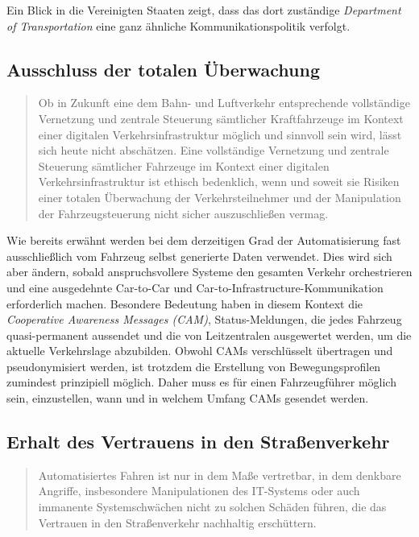 \documentclass[twoside,a4paper,12pt]{article}
\begin{document}
Ein Blick in die Vereinigten Staaten zeigt, dass das dort zuständige \textit{Department of Transportation} eine ganz ähnliche Kommunikationspolitik
verfolgt.~\cite{dot}\\

\subsection{Ausschluss der totalen Überwachung} \label{AusschlussDerTotalenUeberwachung}

\begin{quote}
\glqq
Ob in Zukunft eine dem Bahn- und Luftverkehr entsprechende vollständige Vernetzung
und zentrale Steuerung sämtlicher Kraftfahrzeuge im Kontext einer digitalen Verkehrsinfrastruktur möglich und sinnvoll sein wird, 
lässt sich heute nicht abschätzen. Eine vollständige Vernetzung und zentrale Steuerung sämtlicher Fahrzeuge im Kontext einer 
digitalen Verkehrsinfrastruktur ist ethisch bedenklich, wenn und soweit sie Risiken einer totalen Überwachung der Verkehrsteilnehmer 
und der Manipulation der Fahrzeugsteuerung nicht sicher auszuschließen vermag.\grqq\mbox{~\cite[S. 12]{ek}}
\end{quote}

Wie bereits erwähnt werden bei dem derzeitigen Grad der Automatisierung fast ausschließlich vom Fahrzeug selbst generierte Daten verwendet.
Dies wird sich aber ändern, sobald anspruchsvollere Systeme den gesamten Verkehr orchestrieren und eine ausgedehnte Car-to-Car und 
Car-to-Infrastructure-Kommunikation erforderlich machen. Besondere Bedeutung haben in diesem Kontext die \textit{Cooperative Awareness Messages (CAM)},
Status-Meldungen, die jedes Fahrzeug quasi-permanent aussendet und die von Leitzentralen ausgewertet werden, um die aktuelle Verkehrslage abzubilden.
Obwohl CAMs verschlüsselt übertragen und pseudonymisiert werden, ist trotzdem die Erstellung von Bewegungsprofilen zumindest prinzipiell möglich.
Daher muss es für einen Fahrzeugführer möglich sein, einzustellen, wann und in welchem Umfang CAMs gesendet werden.\\

\subsection{Erhalt des Vertrauens in den Straßenverkehr} \label{ErhaltDesVertrauensInDenStrassenverkehr}

\begin{quote}
\glqq
Automatisiertes Fahren ist nur in dem Maße vertretbar, in dem denkbare Angriffe, insbesondere Manipulationen des 
IT-Systems oder auch immanente Systemschwächen nicht
zu solchen Schäden führen, die das Vertrauen in den Straßenverkehr nachhaltig erschüttern.\grqq\mbox{~\cite[S. 12]{ek}}
\end{quote}
\end{document}
